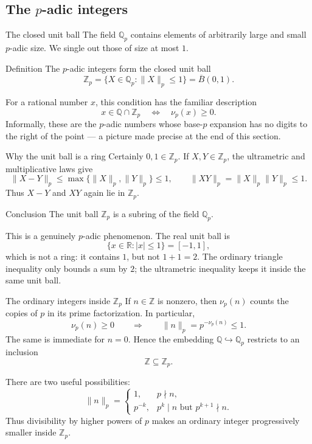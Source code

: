 \documentclass[aspectratio=169,11pt]{beamer}
\newcommand{\Z}{\mathbb Z}
\newcommand{\Q}{\mathbb Q}
\newcommand{\R}{\mathbb R}
\begin{document}
\subsection{\texorpdfstring{The \(p\)-adic integers}{The p-adic integers}}

\begin{frame}{The closed unit ball}
  The field \(\Q_p\) contains elements of arbitrarily large and small
  \(p\)-adic size.  We single out those of size at most \(1\).

  \begin{block}{Definition}
    The \alert{\(p\)-adic integers} form the closed unit ball
    \[
      \boxed{\Z_p
        =\{X\in\Q_p:\|X\|_p\le1\}
        =\overline B(0,1).}
    \]
  \end{block}

  For a rational number \(x\), this condition has the familiar description
  \[
    x\in\Q\cap\Z_p
    \quad\Longleftrightarrow\quad
    \nu_p(x)\ge0.
  \]
  Informally, these are the \(p\)-adic numbers whose base-\(p\) expansion
  has no digits to the right of the point --- a picture made precise at
  the end of this section.
\end{frame}

\begin{frame}{Why the unit ball is a ring}
  Certainly \(0,1\in\Z_p\).  If \(X,Y\in\Z_p\), the ultrametric and
  multiplicative laws give
  \[
    \|X-Y\|_p
      \le\max\{\|X\|_p,\|Y\|_p\}\le1,
    \qquad
    \|XY\|_p=\|X\|_p\|Y\|_p\le1.
  \]
  Thus \(X-Y\) and \(XY\) again lie in \(\Z_p\).

  \begin{alertblock}{Conclusion}
    The unit ball \(\Z_p\) is a subring of the field \(\Q_p\).
  \end{alertblock}

  This is a genuinely \(p\)-adic phenomenon.  The real unit ball is
  \[
    \{x\in\R:|x|\le1\}=[-1,1],
  \]
  which is not a ring: it contains \(1\), but not \(1+1=2\).  The ordinary
  triangle inequality only bounds a sum by \(2\); the ultrametric inequality
  keeps it inside the same unit ball.
\end{frame}

\begin{frame}{The ordinary integers inside \(\Z_p\)}
  If \(n\in\Z\) is nonzero, then \(\nu_p(n)\) counts the copies of \(p\)
  in its prime factorization.  In particular,
  \[
    \nu_p(n)\ge0
    \qquad\Longrightarrow\qquad
    \|n\|_p=p^{-\nu_p(n)}\le1.
  \]
  The same is immediate for \(n=0\).  Hence the embedding
  \(\Q\hookrightarrow\Q_p\) restricts to an inclusion
  \[
    \boxed{\Z\subseteq\Z_p.}
  \]

  There are two useful possibilities:
  \[
    \|n\|_p=
    \begin{cases}
      1,&p\nmid n,\\
      p^{-k},&p^k\mid n\text{ but }p^{k+1}\nmid n.
    \end{cases}
  \]
  Thus divisibility by higher powers of \(p\) makes an ordinary integer
  progressively smaller inside \(\Z_p\).
\end{frame}
\end{document}
